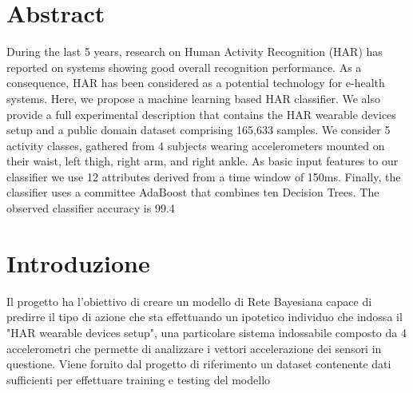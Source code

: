 \documentclass[12pt]{article}
\begin{document}

\tableofcontents
\pagebreak




\section{Abstract}

During the last 5 years, research on Human Activity Recognition (HAR)\cite{HAR} has reported on systems showing good overall recognition performance. As a consequence, HAR has been considered as a potential technology for e-health systems. Here, we propose a machine learning based HAR classifier\cite{Paper}. We also provide a full experimental description that contains the HAR wearable devices setup and a public domain dataset comprising 165,633 samples. We consider 5 activity classes, gathered from 4 subjects wearing accelerometers mounted on their waist, left thigh, right arm, and right ankle. As basic input features to our classifier we use 12 attributes derived from a time window of 150ms. Finally, the classifier uses a committee AdaBoost that combines ten Decision Trees. The observed classifier accuracy is 99.4%


\section{Introduzione}
Il progetto ha l'obiettivo di creare un modello di Rete Bayesiana capace di predirre il tipo di azione che sta effettuando un ipotetico individuo che indossa il "HAR wearable devices setup", una particolare sistema indossabile composto da 4 accelerometri che permette di analizzare i vettori accelerazione dei sensori in questione. Viene fornito dal progetto di riferimento\cite{HAR} un dataset contenente dati sufficienti per effettuare training e testing del modello
\end{document}
